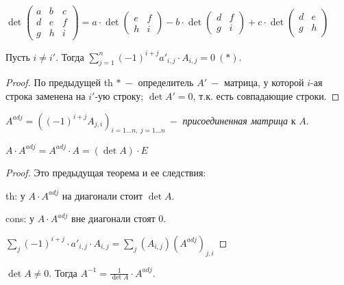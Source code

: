 \begin{example}
    $\det\begin{pmatrix}
             a & b & c \\ d & e & f \\ g & h & i
    \end{pmatrix}=a\cdot \det \begin{pmatrix}
                                  e & f \\ h & i
    \end{pmatrix}-b\cdot \det \begin{pmatrix}
                                  d & f \\ g & i
    \end{pmatrix}+c\cdot \det \begin{pmatrix}
                                  d & e \\ g & h
    \end{pmatrix}$
\end{example}

\begin{corollary}
    Пусть $i\neq i'$. Тогда $\sum\limits_{j=1}^n (-1)^{i+j}a'_{i,j}\cdot A_{i,j}=0\ (*)$.
\end{corollary}

\begin{proof}
    По предыдущей th $*\ -$ определитель $A'\ -$ матрица, у которой $i$-ая строка заменена на $i'$-ую строку; $\det A'=0$, т.к. есть совпадающие строки.
\end{proof}

\begin{definition}
    $A^{adj}=((-1)^{i+j}A_{j,i})_{i=1...n,\ j=1...n}\ -$ \textit{присоединенная матрица} к $A$.
\end{definition}

\begin{statement}
    $A\cdot A^{adj}=A^{adj}\cdot A=(\det A)\cdot E$
\end{statement}

\begin{proof}
    Это предыдущая теорема и ее следствия:

    th: у $A\cdot A^{adj}$ на диагонали стоит $\det A$.

    cons: у $A\cdot A^{adj}$ вне диагонали стоят 0.

    $\sum\limits_j (-1)^{i+j}\cdot a'_{i,j}\cdot A_{i,j}=\sum\limits_j (A_{i,j})(A^{adj})_{j,i}$
\end{proof}

\begin{corollary}
    $\det A\neq 0$. Тогда $A^{-1}=\frac{1}{\det A}\cdot A^{adj}$.
\end{corollary}

